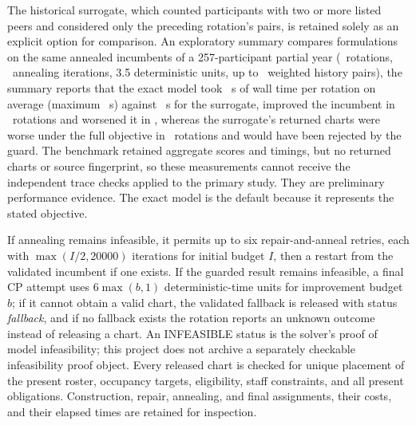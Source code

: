 \documentclass[11pt,a4paper]{article}
\theoremstyle{definition}\newtheorem{definition}[theorem]{Definition}
\theoremstyle{remark}\newtheorem{remark}[theorem]{Remark}
\begin{document}
The historical surrogate, which counted participants with two or more listed peers and considered only the preceding rotation's pairs, is retained solely as an explicit option for comparison. An exploratory summary compares formulations on the same annealed incumbents of a 257-participant partial year (\BenchRotations\ rotations, \BenchAnnealIters\ annealing iterations, 3.5 deterministic units, up to \BenchMaxHistoryPairs\ weighted history pairs), the summary reports that the exact model took \BenchExactMeanSeconds\ s of wall time per rotation on average (maximum \BenchExactMaxSeconds\ s) against \BenchSurrogateMeanSeconds\ s for the surrogate, improved the incumbent in \BenchExactImproved\ rotations and worsened it in \BenchExactWorsened, whereas the surrogate's returned charts were worse under the full objective in \BenchSurrogateWorsened\ rotations and would have been rejected by the guard. The benchmark retained aggregate scores and timings, but no returned charts or source fingerprint, so these measurements cannot receive the independent trace checks applied to the primary study. They are preliminary performance evidence. The exact model is the default because it represents the stated objective.

If annealing remains infeasible, it permits up to six repair-and-anneal retries, each with $\max(I/2,20000)$ iterations for initial budget $I$, then a restart from the validated incumbent if one exists. If the guarded result remains infeasible, a final CP attempt uses $6\max(b,1)$ deterministic-time units for improvement budget $b$; if it cannot obtain a valid chart, the validated fallback is released with status \emph{fallback}, and if no fallback exists the rotation reports an unknown outcome instead of releasing a chart. An INFEASIBLE status is the solver's proof of model infeasibility; this project does not archive a separately checkable infeasibility proof object. Every released chart is checked for unique placement of the present roster, occupancy targets, eligibility, staff constraints, and all present obligations. Construction, repair, annealing, and final assignments, their costs, and their elapsed times are retained for inspection.
\end{document}
